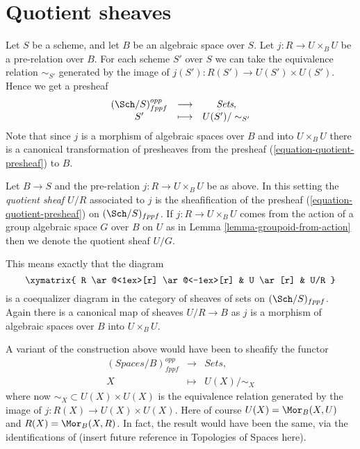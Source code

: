 \section{Quotient sheaves}
\label{section-quotient-sheaves}

\noindent
Let $S$ be a scheme, and let $B$ be an algebraic space over $S$.
Let $j : R \to U \times_B U$ be a pre-relation over $B$.
For each scheme $S'$ over $S$ we can take the equivalence relation
$\sim_{S'}$ generated by the image of $j(S') : R(S') \to U(S') \times U(S')$.
Hence we get a presheaf
\begin{equation}
\label{equation-quotient-presheaf}
\begin{matrix}
(\Sch/S)^{opp}_{fppf} &
\longrightarrow &
\textit{Sets}, \\
S' &
\longmapsto  &
U(S')/\sim_{S'}
\end{matrix}
\end{equation}
Note that since $j$ is a morphism of algebraic spaces over $B$
and into $U \times_B U$ there is a canonical transformation of
presheaves from the presheaf (\ref{equation-quotient-presheaf}) to $B$.

\begin{definition}
\label{definition-quotient-sheaf}
Let $B \to S$ and the pre-relation $j : R \to U \times_B U$ be as above.
In this setting the {\it quotient sheaf $U/R$} associated
to $j$ is the sheafification of the presheaf
(\ref{equation-quotient-presheaf}) on $(\Sch/S)_{fppf}$.
If $j : R \to U \times_B U$ comes from the action of a
group algebraic space $G$ over $B$ on $U$ as in
Lemma \ref{lemma-groupoid-from-action}
then we denote the quotient sheaf $U/G$.
\end{definition}

\noindent
This means exactly that the diagram
$$
\xymatrix{
R \ar@<1ex>[r] \ar@<-1ex>[r] &
U \ar[r] &
U/R
}
$$
is a coequalizer diagram in the category of sheaves of sets
on $(\Sch/S)_{fppf}$. Again there is a canonical map
of sheaves $U/R \to B$ as $j$ is a morphism of algebraic spaces over
$B$ into $U \times_B U$.

\begin{remark}
\label{remark-quotient-variant}
A variant of the construction above would have been to sheafify
the functor
$$
\begin{matrix}
(\textit{Spaces}/B)^{opp}_{fppf} &
\longrightarrow &
\textit{Sets}, \\
X &
\longmapsto  &
U(X)/\sim_X
\end{matrix}
$$
where now $\sim_X \subset U(X) \times U(X)$ is the equivalence relation
generated by the image of $j : R(X) \to U(X) \times U(X)$.
Here of course $U(X) = \Mor_B(X, U)$ and $R(X) = \Mor_B(X, R)$.
In fact, the result would have been the same, via the identifications
of (insert future reference in Topologies of Spaces here).
\end{remark}

